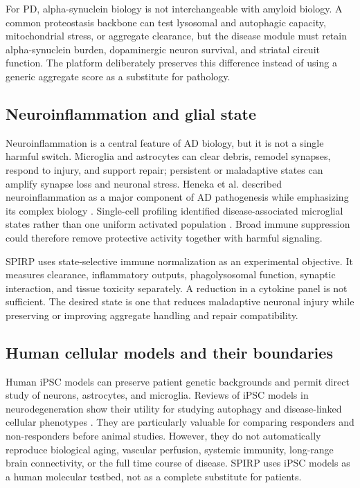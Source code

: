 \documentclass[conference]{IEEEtran}
\begin{document}
For PD, alpha-synuclein biology is not interchangeable with amyloid biology. A common proteostasis backbone can test lysosomal and autophagic capacity, mitochondrial stress, or aggregate clearance, but the disease module must retain alpha-synuclein burden, dopaminergic neuron survival, and striatal circuit function. The platform deliberately preserves this difference instead of using a generic aggregate score as a substitute for pathology.

\subsection{Neuroinflammation and glial state}
Neuroinflammation is a central feature of AD biology, but it is not a single harmful switch. Microglia and astrocytes can clear debris, remodel synapses, respond to injury, and support repair; persistent or maladaptive states can amplify synapse loss and neuronal stress. Heneka et al. described neuroinflammation as a major component of AD pathogenesis while emphasizing its complex biology \cite{heneka2015}. Single-cell profiling identified disease-associated microglial states rather than one uniform activated population \cite{keren2017}. Broad immune suppression could therefore remove protective activity together with harmful signaling.

SPIRP uses state-selective immune normalization as an experimental objective. It measures clearance, inflammatory outputs, phagolysosomal function, synaptic interaction, and tissue toxicity separately. A reduction in a cytokine panel is not sufficient. The desired state is one that reduces maladaptive neuronal injury while preserving or improving aggregate handling and repair compatibility.

\subsection{Human cellular models and their boundaries}
Human iPSC models can preserve patient genetic backgrounds and permit direct study of neurons, astrocytes, and microglia. Reviews of iPSC models in neurodegeneration show their utility for studying autophagy and disease-linked cellular phenotypes \cite{seranova2020}. They are particularly valuable for comparing responders and non-responders before animal studies. However, they do not automatically reproduce biological aging, vascular perfusion, systemic immunity, long-range brain connectivity, or the full time course of disease. SPIRP uses iPSC models as a human molecular testbed, not as a complete substitute for patients.
\end{document}
